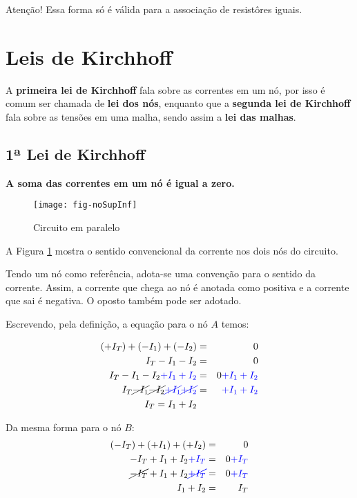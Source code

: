 Atenção! Essa forma só é válida para a associação de resistôres iguais.










\section{Leis de Kirchhoff}

A \textbf{primeira lei de Kirchhoff} fala sobre as correntes em um nó, por isso é comum ser chamada de \textbf{lei dos nós}, enquanto que a \textbf{segunda lei de Kirchhoff} fala sobre as tensões em uma malha, sendo assim a \textbf{lei das malhas}.


\subsection{1ª Lei de Kirchhoff}

\textbf{A soma das correntes em um nó é igual a zero.}

\begin{figure}[!h]
	\centering
	\caption{Circuito em paralelo}
	\texttt{[image: fig-noSupInf]}
	\label{fig:nosAeB}
\end{figure}


A Figura \ref{fig:nosAeB} mostra o sentido convencional da corrente nos dois nós do circuito.

Tendo um nó como referência, adota-se uma convenção para o sentido da corrente. Assim, a corrente que chega ao nó é anotada como positiva e a corrente que sai é negativa. O oposto também pode ser adotado.

Escrevendo, pela definição, a equação para o nó $A$ temos:

\begin{eqnarray}
\label{eq:1kirchhoff}
(+I_T) + (-I_1) + (-I_2) & = & 0\\
I_T - I_1 - I_2 & = & 0 \nonumber\\
I_T - I_1 - I_2 \color{blue}{+ I_1 + I_2}& = & 0 \color{blue}{+I_1 + I_2} \nonumber\\
I_T \cancel{-I_1} \cancel{- I_2} \color{blue}{\cancel{+ I_1} \cancel{+ I_2}}& = & \color{blue}{+I_1 + I_2} \nonumber\\
I_T = I_1 + I_2
\end{eqnarray}

Da mesma forma para o nó $B$:
\begin{eqnarray}
(-I_T) + (+I_1) + (+I_2) & = & 0 \nonumber\\
-I_T + I_1 + I_2 \color{blue}{+I_T}& = & 0\color{blue}{+I_T} \nonumber\\
\cancel{-I_T} + I_1 + I_2 \color{blue}{\cancel{+I_T}}& = & 0\color{blue}{+I_T} \nonumber\\
I_1 + I_2 & = & I_T \nonumber
\end{eqnarray}











